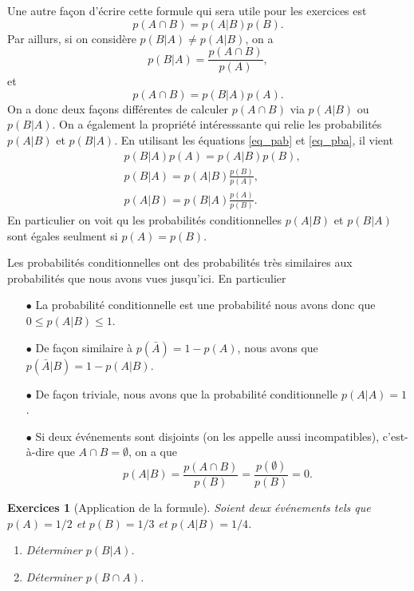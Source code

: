 \documentclass[a4paper,12pt]{book}
\newtheorem*{exercices}{Exercices}
\begin{document}
Une autre façon d'écrire cette formule qui sera utile pour les exercices est 
\begin{equation}
 p(A\cap B)=p(A|B)p(B).\label{eq_pab}
\end{equation}
Par aillurs, si on considère $p(B|A)\neq p(A|B)$, on a
\begin{equation}
 p(B|A)=\frac{p(A\cap B)}{p(A)},
\end{equation}
et 
\begin{equation}
 p(A\cap B)=p(B|A)p(A).\label{eq_pba}
\end{equation}
On a donc deux façons différentes de calculer $p(A\cap B)$ via $p(A|B)$ ou $p(B|A)$.
On a également la propriété intéresssante qui relie les probabilités $p(A|B)$ et $p(B|A)$.
En utilisant les équations \eqref{eq_pab} et \eqref{eq_pba}, il vient
\begin{align}
 &p(B|A)p(A)=p(A|B)p(B),\nonumber\\
 &p(B|A)=p(A|B)\frac{p(B)}{p(A)},\\
 &p(A|B)=p(B|A)\frac{p(A)}{p(B)}.
\end{align}
En particulier on voit qu les probabilités conditionnelles $p(A|B)$ et $p(B|A)$ sont égales
seulment si $p(A)=p(B)$.

Les probabilités conditionnelles ont des probabilités très similaires aux probabilités 
que nous avons vues jusqu'ici. En particulier
\begin{itemize}
\item[$\bullet$] La probabilité conditionnelle est une probabilité nous avons donc que $0\leq p(A|B)\leq 1$. 
\item[$\bullet$] De façon similaire à $p(\bar A)=1-p(A)$, nous avons que $p(\bar A|B)=1-p(A|B)$.
\item[$\bullet$] De façon triviale, nous avons que la probabilité conditionnelle $p(A|A)=1$.
\item[$\bullet$] Si deux événements sont disjoints (on les appelle aussi incompatibles), c'est-à-dire que $A\cap B=\emptyset$,
on a que
\begin{equation}
p(A|B)=\frac{p(A\cap B)}{p(B)}=\frac{p(\emptyset)}{p(B)}=0.
\end{equation}
\end{itemize}
\begin{exercices}[Application de la formule]
Soient deux événements tels que $p(A)=1/2$ et $p(B)=1/3$ et $p(A|B)=1/4$. 
\begin{enumerate}
 \item Déterminer $p(B|A)$.
 \item Déterminer $p(B \cap A)$.
\end{enumerate}
\end{exercices}
\end{document}
